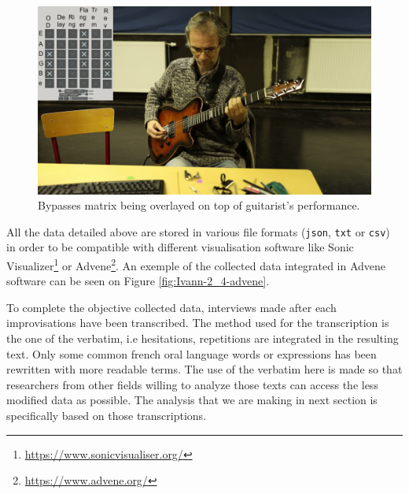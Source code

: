 \documentclass{article}
\begin{document}
\begin{figure}
    \centering
    \includegraphics[width=0.9\columnwidth]{figures/Raphael-2_5-rec-impro_01-screenshot-00_05_30_800}
    \caption{Bypasses matrix being overlayed on top of guitarist's performance.}
    \label{fig:overlay}
\end{figure}

All the data detailed above are stored in various file formats (\texttt{json}, \texttt{txt} or \texttt{csv}) in order to be compatible with different visualisation software like Sonic Visualizer\footnote{\href{https://www.sonicvisualiser.org/}{https://www.sonicvisualiser.org/}} or Advene\footnote{\href{https://www.advene.org/}{https://www.advene.org/}}. An exemple of the collected data integrated in Advene software can be seen on Figure \ref{fig:Ivann-2_4-advene}. %

To complete the objective collected data, interviews made after each improvisations have been transcribed.  The method used for the transcription is the one of the verbatim, i.e hesitations, repetitions are integrated in the resulting text. Only some common french oral language words or expressions has been rewritten with more readable terms. The use of the verbatim here is made so that researchers from other fields willing to analyze those texts can access the less modified data as possible. The analysis that we are making in next section is specifically based on those transcriptions. 



\end{document}
